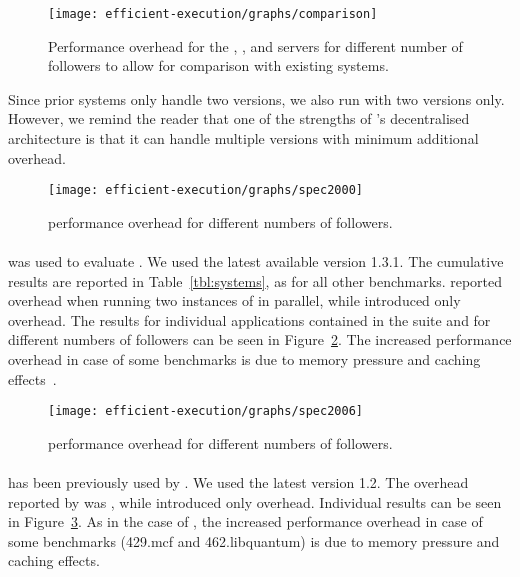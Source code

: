 \begin{figure}[!t]
 \centering
 \texttt{[image: efficient-execution/graphs/comparison]}
 \caption{Performance overhead for the \httpd, \thttpd, and \lighttpd
   servers for different number of followers to allow for comparison
   with existing systems.}
 \label{fig:comparison}
\end{figure}

Since prior systems only handle two versions, we also run \varan with
two versions only.  However, we remind the reader that one of the
strengths of \varan's decentralised architecture is that it can handle
multiple versions with minimum additional overhead.

\begin{figure}[!t]
  \centering
  \texttt{[image: efficient-execution/graphs/spec2000]}
  \caption{\speczerozero performance overhead for different numbers of followers.}
  \label{fig:spec2000}
\end{figure}

\paragraph{\speczerozero} %
was used to evaluate \orchestra. We used the latest available version
1.3.1.  The cumulative results are reported in
Table~\ref{tbl:systems}, as for all other benchmarks.  \orchestra
reported \orchestraSpec overhead when running two instances of
\speczerozero in parallel, while \varan introduced only
\speczerozeroOneFollower overhead. The results for individual
applications contained in the \speczerozero suite and for different
numbers of followers can be seen in Figure~\ref{fig:spec2000}. The
increased performance overhead in case of some benchmarks is due to
memory pressure and caching effects~\cite{jaleel07}.

\begin{figure}[!t]
  \centering
  \texttt{[image: efficient-execution/graphs/spec2006]}
  \caption{\speczerosix performance overhead for different numbers of followers.}
  \label{fig:spec2006}
\end{figure}

\paragraph{\speczerosix} %
has been previously used by \mx. We used the latest version 1.2.  The
overhead reported by \mx was \mxSpec, while \varan introduced only
\speczerosixOneFollower overhead.
Individual results can be seen in Figure~\ref{fig:spec2006}.  As in
the case of \speczerozero, the increased performance overhead in case
of some benchmarks (\ie \textsf{429.mcf} and \textsf{462.libquantum})
is due to memory pressure and caching effects. %

